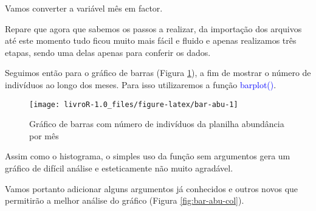 \documentclass[14pt,titlepage, oneside, openany, a4paper]{book}
\newenvironment{Shaded}{\begin{snugshade}}{\end{snugshade}}
\newcommand{\DataTypeTok}[1]{\textcolor[rgb]{0.13,0.29,0.53}{#1}}
\newcommand{\DecValTok}[1]{\textcolor[rgb]{0.00,0.00,0.81}{#1}}
\newcommand{\KeywordTok}[1]{\textcolor[rgb]{0.13,0.29,0.53}{\textbf{#1}}}
\newcommand{\NormalTok}[1]{#1}
\newcommand{\OperatorTok}[1]{\textcolor[rgb]{0.81,0.36,0.00}{\textbf{#1}}}
\newcommand{\StringTok}[1]{\textcolor[rgb]{0.31,0.60,0.02}{#1}}
\begin{document}
Vamos converter a variável mês em factor.

\begin{Shaded}
\end{Shaded}

Repare que agora que sabemos os passos a realizar, da importação dos arquivos até este momento tudo ficou muito mais fácil e fluido e apenas realizamos três etapas, sendo uma delas apenas para conferir os dados.

Seguimos então para o gráfico de barras (Figura \ref{fig:bar-abu}), a fim de mostrar o número de indivíduos ao longo dos meses. Para isso utilizaremos a função \textcolor{blue}{barplot()}.

\begin{Shaded}
\end{Shaded}

\begin{figure}[H]

{\centering \texttt{[image: livroR-1.0\_files/figure-latex/bar-abu-1]} 

}

\caption{Gráfico de barras com número de indivíduos da planilha abundância por mês}\label{fig:bar-abu}
\end{figure}

Assim como o histograma, o simples uso da função sem argumentos gera um gráfico de difícil análise e esteticamente não muito agradável.

Vamos portanto adicionar alguns argumentos já conhecidos e outros novos que permitirão a melhor análise do gráfico (Figura \ref{fig:bar-abu-col}).

\begin{Shaded}
\end{Shaded}
\end{document}
